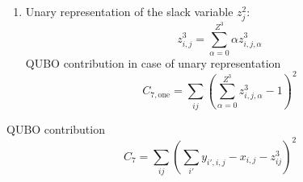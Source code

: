 \documentclass{article}
\begin{document}
\begin{itemize}
\begin{enumerate}
        \item 
        Unary representation of the slack variable $z^2_j$:
        \begin{equation*}
            z^3_{i, j} = \sum_{\alpha = 0}^{Z^3} \alpha z^3_{i, j, \alpha}
        \end{equation*}
        QUBO contribution in case of unary representation
        \begin{equation*}
            C_{7, \text{one}} = \sum_{ij} \left( \sum_{\alpha = 0}^{Z^3} z^3_{i, j, \alpha} - 1 \right)^2
        \end{equation*}
    \end{enumerate}
    QUBO contribution
    \begin{equation*}
        C_7 = \sum_{ij} \left(\sum_{i'} y_{i', i, j} - x_{i, j} -  z^3_{ij} \right)^2
    \end{equation*}
\end{itemize}
\end{document}
